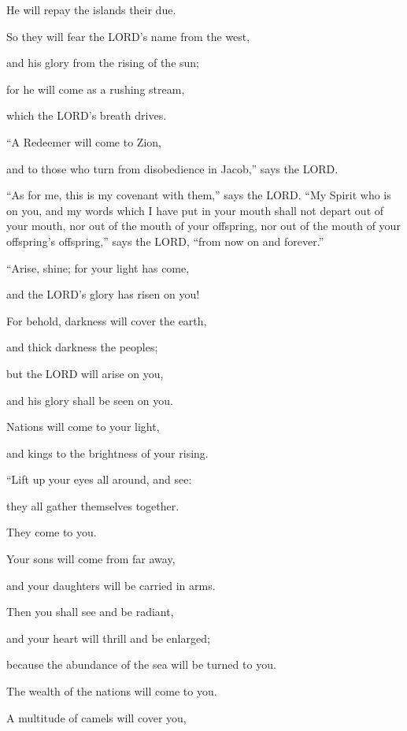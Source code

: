 He will repay the islands their due.

\myverse{}So they will fear the LORD’s name from the west,

and his glory from the rising of the sun;

for he will come as a rushing stream,

which the LORD’s breath drives.


\vspace{\baselineskip} \myverse{}“A Redeemer will come to Zion,

and to those who turn from disobedience in Jacob,” says the LORD.

\myverse{}“As for me, this is my covenant with them,” says the LORD. “My
Spirit who is on you, and my words which I have put in your mouth shall not depart out of your mouth,
nor out of the mouth of your offspring, nor out of the mouth of your offspring’s offspring,” says the
LORD, “from now on and forever.”


\mychapter{} \myverse*{}“Arise, shine; for your light has come,

\quad\quad and the LORD’s glory has risen on you!

\myverse{}For behold, darkness will cover the earth,

and thick darkness the peoples;

but the LORD will arise on you,

and his glory shall be seen on you.

\myverse{}Nations will come to your light,

and kings to the brightness of your rising.


\vspace{\baselineskip} \myverse{}“Lift up your eyes all around, and see:

they all gather themselves together.

They come to you.

Your sons will come from far away,

and your daughters will be carried in arms.

\myverse{}Then you shall see and be radiant,

and your heart will thrill and be enlarged;

because the abundance of the sea will be turned to you.

The wealth of the nations will come to you.

\myverse{}A multitude of camels will cover you,

